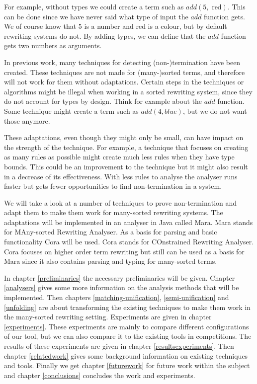 For example, without types we could create a term such as $add(5, \text{ red})$. This can be done since we have never said what type of input the $add$ function gets. We of course know that $5$ is a number and red is a colour, but by default rewriting systems do not. By adding types, we can define that the $add$ function gets two numbers as arguments.

In previous work, many techniques for detecting (non-)termination have been created. These techniques are not made for (many-)sorted terms, and therefore will not work for them without adaptations. Certain steps in the techniques or algorithms might be illegal when working in a sorted rewriting system, since they do not account for types by design. Think for example about the $add$ function. Some technique might create a term such as $add(4, blue)$, but we do not want those anymore. 

These adaptations, even though they might only be small, can have impact on the strength of the technique. For example, a technique that focuses on creating as many rules as possible might create much less rules when they have type bounds. This could be an improvement to the technique but it might also result in a decrease of its effectiveness. With less rules to analyse the analyser runs faster but gets fewer opportunities to find non-termination in a system. 

We will take a look at a number of techniques to prove non-termination and adapt them to make them work for many-sorted rewriting systems. The adaptations will be implemented in an analyser in Java called Mara. Mara stands for MAny-sorted Rewriting Analyser. As a basis for parsing and basic functionality Cora will be used. Cora stands for COnstrained Rewriting Analyser. Cora focuses on higher order term rewriting but still can be used as a basis for Mara since it also contains parsing and typing for many-sorted terms. 

In chapter \ref{preliminaries} the necessary preliminaries will be given. Chapter \ref{analysers} gives some more information on the analysis methods that will be implemented. Then chapters \ref{matching-unification}, \ref{semi-unification} and \ref{unfolding} are about transforming the existing techniques to make them work in the many-sorted rewriting setting. Experiments are given in chapter \ref{experiments}. These experiments are mainly to compare different configurations of our tool, but we can also compare it to the existing tools in competitions. The results of these experiments are given in chapter \ref{resultsexperiments}. Then chapter \ref{relatedwork} gives some background information on existing techniques and tools. Finally we get chapter \ref{futurework} for future work within the subject and chapter \ref{conclusions} concludes the work and experiments. 